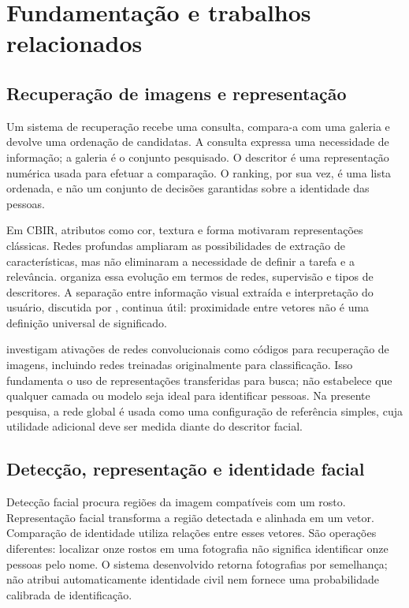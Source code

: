 \chapter{Fundamentação e trabalhos relacionados}\label{cap:fundamentacao}
\section{Recuperação de imagens e representação}
Um sistema de recuperação recebe uma consulta, compara-a com uma galeria e devolve uma ordenação de candidatas. A consulta expressa uma necessidade de informação; a galeria é o conjunto pesquisado. O descritor é uma representação numérica usada para efetuar a comparação. O ranking, por sua vez, é uma lista ordenada, e não um conjunto de decisões garantidas sobre a identidade das pessoas.

Em CBIR, atributos como cor, textura e forma motivaram representações clássicas. Redes profundas ampliaram as possibilidades de extração de características, mas não eliminaram a necessidade de definir a tarefa e a relevância.  organiza essa evolução em termos de redes, supervisão e tipos de descritores. A separação entre informação visual extraída e interpretação do usuário, discutida por , continua útil: proximidade entre vetores não é uma definição universal de significado.

 investigam ativações de redes convolucionais como códigos para recuperação de imagens, incluindo redes treinadas originalmente para classificação. Isso fundamenta o uso de representações transferidas para busca; não estabelece que qualquer camada ou modelo seja ideal para identificar pessoas. Na presente pesquisa, a rede global é usada como uma configuração de referência simples, cuja utilidade adicional deve ser medida diante do descritor facial.

\section{Detecção, representação e identidade facial}
Detecção facial procura regiões da imagem compatíveis com um rosto. Representação facial transforma a região detectada e alinhada em um vetor. Comparação de identidade utiliza relações entre esses vetores. São operações diferentes: localizar onze rostos em uma fotografia não significa identificar onze pessoas pelo nome. O sistema desenvolvido retorna fotografias por semelhança; não atribui automaticamente identidade civil nem fornece uma probabilidade calibrada de identificação.

